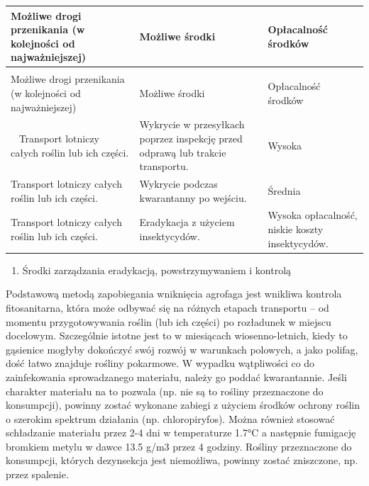 \documentclass[polish,a4paper]{article}
\providecommand{\tightlist}{%
  \setlength{\itemsep}{0pt}\setlength{\parskip}{0pt}}
\begin{document}
\begin{longtabu} to 
\toprule
{}  \textbf{Możliwe drogi przenikania (w kolejności od najważniejszej)} & \textbf{Możliwe środki} & \textbf{Opłacalność środków}\\
\midrule
\endfirsthead
{}\\
\toprule
Możliwe drogi przenikania (w kolejności od najważniejszej) & Możliwe środki & Opłacalność środków\\
\midrule
\endhead
\
\endfoot
\bottomrule
\endlastfoot
Transport lotniczy całych roślin lub ich części. & Wykrycie w przesyłkach poprzez inspekcję przed odprawą lub trakcie transportu. & Wysoka\\
Transport lotniczy całych roślin lub ich części. & Wykrycie podczas kwarantanny po wejściu. & Średnia\\
Transport lotniczy całych roślin lub ich części. & Eradykacja z użyciem insektycydów. & Wysoka opłacalność, niskie koszty insektycydów.\\*
\end{longtabu}

\begin{enumerate}
\def\labelenumi{\Roman{enumi})}
\setcounter{enumi}{1}
\tightlist
\item
  Środki zarządzania eradykacją, powstrzymywaniem i kontrolą
\end{enumerate}

Podstawową metodą zapobiegania wniknięcia agrofaga jest wnikliwa
kontrola fitosanitarna, która może odbywać się na różnych etapach
transportu -- od momentu przygotowywania roślin (lub ich części) po
rozładunek w miejscu docelowym. Szczególnie istotne jest to w miesiącach
wiosenno-letnich, kiedy to gąsienice mogłyby dokończyć swój rozwój w
warunkach polowych, a jako polifag, dość łatwo znajduje rośliny
pokarmowe. W wypadku wątpliwości co do zainfekowania sprowadzanego
materiału, należy go poddać kwarantannie. Jeśli charakter materiału na
to pozwala (np. nie są to rośliny przeznaczone do konsumpcji), powinny
zostać wykonane zabiegi z użyciem środków ochrony roślin o szerokim
spektrum działania (np. chloropiryfos). Można również stosować
schładzanie materiału przez 2-4 dni w temperaturze 1.7°C a następnie
fumigację bromkiem metylu w dawce 13.5 g/m3 przez 4 godziny. Rośliny
przeznaczone do konsumpcji, których dezynsekcja jest niemożliwa, powinny
zostać zniszczone, np. przez spalenie.
\end{document}
